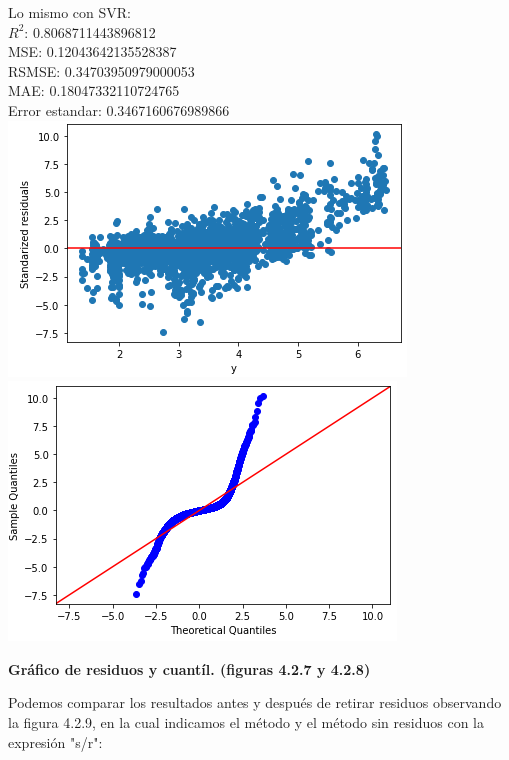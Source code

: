 \documentclass{article}
\begin{document}
        
        Lo mismo con SVR:\\
        
                $R^2$:  0.8068711443896812\\
                MSE:  0.12043642135528387\\
                RSMSE:  0.34703950979000053\\
                MAE:  0.18047332110724765\\
                Error estandar:  0.3467160676989866\\
        
        
                \includegraphics[scale=0.6]{images/residuos-stage-SVR-2.PNG} 
                \includegraphics[scale=0.6]{images/residuos-stage-SVR-quantil.PNG} \\
                        \begin{center}
                    \textbf{Gráfico de residuos y cuantíl. (figuras 4.2.7 y 4.2.8)}
                \end{center}
        
        Podemos comparar los resultados antes y después de retirar residuos observando la figura 4.2.9, en la cual indicamos el método y el método sin residuos con la expresión "s/r":\\
        
\end{document}

